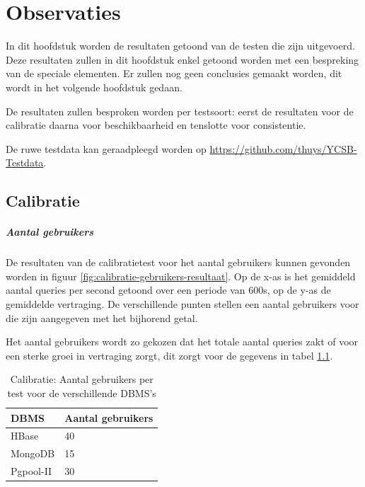 \chapter{Observaties}
In dit hoofdstuk worden de resultaten getoond van de testen die zijn uitgevoerd. Deze resultaten zullen in dit hoofdstuk enkel getoond worden met een bespreking van de speciale elementen. Er zullen nog geen conclusies gemaakt worden, dit wordt in het volgende hoofdstuk gedaan. 

De resultaten zullen besproken worden per testsoort: eerst de resultaten voor de calibratie daarna voor beschikbaarheid en tenslotte voor consistentie. 

De ruwe testdata kan geraadpleegd worden op \url{https://github.com/thuys/YCSB-Testdata}. 

\section{Calibratie}

\paragraph{Aantal gebruikers}
De resultaten van de calibratietest voor het aantal gebruikers kunnen gevonden worden in figuur \ref{fig:calibratie-gebruikers-resultaat}. Op de x-as is het gemiddeld aantal queries per second getoond over een periode van 600s, op de y-as de gemiddelde vertraging. De verschillende punten stellen een aantal gebruikers voor die zijn aangegeven met het bijhorend getal. 

Het aantal gebruikers wordt zo gekozen dat het totale aantal queries zakt of voor een sterke groei in vertraging zorgt, dit zorgt voor de gegevens in tabel \ref{table:calibratie-gebruikers-resultaat}. 

\begin{table}[h!]
	\centering
	\begin{tabular}{l| l }
		\textbf{DBMS} & Aantal gebruikers \\
		\hline
		HBase & 40 \\
		MongoDB & 15\\
		Pgpool-II & 30\\
	\end{tabular}
	\caption{Calibratie: Aantal gebruikers per test voor de verschillende DBMS's}
	\label{table:calibratie-gebruikers-resultaat}
\end{table}


